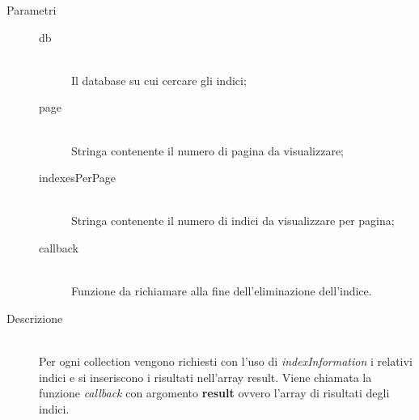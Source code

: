 \begin{description}
\begin{mldescription}
          \begin{description}
      	 \item[Parametri] \hfill
      	  \begin{description}
      	   \item[db] \hfill \\
      	   Il database su cui cercare gli indici;
      	   \item[page] \hfill \\
      	   Stringa contenente il numero di pagina da visualizzare;
      	   \item[indexesPerPage] \hfill \\
      	   Stringa contenente il numero di indici da visualizzare per pagina;
      	   \item[callback] \hfill \\
      	   Funzione da richiamare alla fine dell'eliminazione dell'indice.
      	  \end{description}
      	 \item[Descrizione] \hfill \\
      	 Per ogni collection vengono richiesti con l'uso di \textit{indexInformation} i relativi indici e si inseriscono i risultati nell'array result. Viene chiamata la funzione \textit{callback} con argomento \textbf{result} ovvero l'array di risultati degli indici.  	 
      	\end{description} 	   
    

\end{mldescription}
\end{description}
